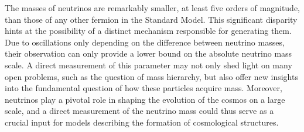The masses of neutrinos are remarkably smaller, at least five orders of magnitude, than those of any other fermion in
the Standard Model. This significant disparity hints at the possibility of a distinct mechanism responsible for
generating them. Due to oscillations only depending on the difference between neutrino masses, their observation can only provide a lower
bound on the absolute neutrino mass scale. A direct measurement of this parameter may not only shed light on many open problems,
such as the question of mass hierarchy, but also offer new insights into the fundamental question of how these particles acquire
mass. Moreover, neutrinos play a pivotal role in shaping the evolution of the cosmos on
a large scale, and a direct measurement of the neutrino mass could thus serve as a crucial input for models describing the formation of cosmological structures.


